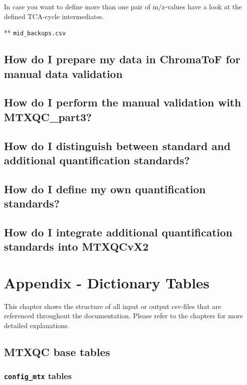 \documentclass[]{book}
\theoremstyle{definition}
\theoremstyle{definition}
\theoremstyle{definition}
\theoremstyle{remark}
\begin{document}
In case you want to define more than one pair of m/z-values have a look
at the defined TCA-cycle intermediates.

** \texttt{mid\_backups.csv}

\section{How do I prepare my data in ChromaToF for manual data
validation}\label{howmanval-chroma}

\section{How do I perform the manual validation with
MTXQC\_part3?}\label{howmanval-part3}

\section{How do I distinguish between standard and additional
quantification standards?}\label{quantquant}

\section{How do I define my own quantification
standards?}\label{quantind}

\section{How do I integrate additional quantification standards into
MTXQCvX2}\label{addqadds}

\chapter{Appendix - Dictionary Tables}\label{tables}

This chapter shows the structure of all input or output csv-files that
are referenced throughout the documentation. Please refer to the
chapters for more detailed explanations.

\section{MTXQC base tables}\label{mtxqc-base-tables}

\subsection{\texorpdfstring{\texttt{config\_mtx}
tables}{config\_mtx tables}}\label{config_mtx-tables}
\end{document}
